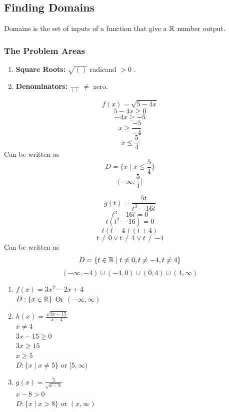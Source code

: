 \subsection{Finding Domains}
\begin{definition}[Domains]
  Domains is the set of inputs of a function that give a $\mathbb{R}$ number output.
\end{definition}

\subsubsection{The Problem Areas}
\begin{enumerate}
\item \textbf{Square Roots: } $\sqrt{()}$ radicand $> 0$ .
\item \textbf{Denominators: } $\frac{}{()}$ $\ne$ zero.
\end{enumerate}

\begin{example}
  $$f(x) = \sqrt{5 - 4x}$$
  $$5 - 4x \ge 0$$
  $$-4x \ge -5$$
  $$x \ge \frac{-5}{-4}$$
  $$x \le \frac{5}{4}$$
  Can be written as
  $$D = \{x \mid x \le \frac{5}{4}\}$$
  $$ (-\infty, \frac{5}{4}]$$
\end{example}

\begin{example}[Denominator]
  $$g(t) = \frac{5t}{t^3 - 16t}$$
  $$t^3 - 16t = 0$$
  $$t(t^2 - 16) = 0$$
  $$t(t - 4)(t + 4)$$
  $$t \ne 0 \lor t \ne 4 \lor t \ne -4$$
  Can be written as
  $$D = \{t \in \mathbb{R} \mid t \ne 0, t \ne -4, t \ne 4 \}$$
  $$(-\infty, -4) \cup (-4, 0) \cup (0, 4) \cup (4, \infty)$$
\end{example}

\begin{example}[Examples]
  \hfill
  \begin{enumerate}
  \item $f(x) = 3x^2 - 2x + 4$ \\
    $D: \{x \in \mathbb{R} \}$
    Or
    $(-\infty, \infty)$
  \item $h(x) = \frac{\sqrt{3x - 15}}{x - 4}$ \\
    $x \ne 4$ \\
    $3x - 15 \ge 0$ \\
    $3x \ge 15$ \\
    $x \ge 5$ \\
    $D: \{x \mid x \ne 5\}$ or $[5, \infty)$
  \item $g(x) = \frac{5}{\sqrt{x - 8}}$ \\
    $x - 8 > 0$ \\
    $D: \{ x \mid x > 8\}$ or $(x, \infty)$
  \end{enumerate}
\end{example}
